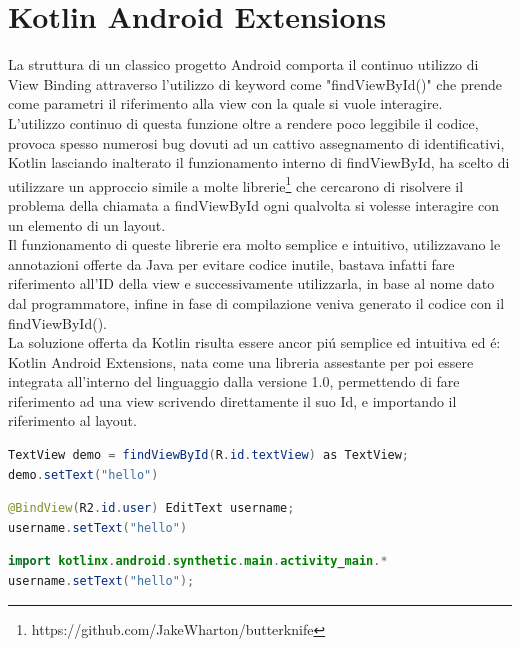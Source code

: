 \section{ Kotlin Android Extensions }
La struttura di un classico progetto Android comporta il continuo utilizzo di View Binding attraverso l'utilizzo di keyword come "findViewById()" che prende come parametri il riferimento alla view con la quale si vuole interagire. \\
L'utilizzo continuo di questa funzione oltre a rendere poco leggibile il codice, provoca spesso numerosi bug dovuti ad un cattivo assegnamento di identificativi, Kotlin lasciando inalterato il funzionamento interno di findViewById, ha scelto di utilizzare un approccio simile a molte librerie\footnote{https://github.com/JakeWharton/butterknife} che cercarono di risolvere il problema della chiamata a findViewById ogni qualvolta si volesse interagire con un elemento di un layout.\\
Il funzionamento di queste librerie era molto semplice e intuitivo, utilizzavano le annotazioni offerte da Java per evitare codice inutile, bastava infatti fare riferimento all'ID della view e successivamente utilizzarla, in base al nome dato dal programmatore, infine in fase di compilazione veniva generato il codice con il findViewById().\\
La soluzione offerta da Kotlin risulta essere ancor pi\'u semplice ed intuitiva ed \'e: Kotlin Android Extensions, nata come una libreria assestante per poi essere integrata all'interno del linguaggio dalla versione 1.0, permettendo di fare riferimento ad una view scrivendo direttamente il suo Id, e importando il riferimento al layout.

\begin{lstlisting}[language=java,caption={Esempio Java}]
TextView demo = findViewById(R.id.textView) as TextView;
demo.setText("hello")
\end{lstlisting}

\begin{lstlisting}[language=java,caption={Esempio Java + Libreria esterna}]
@BindView(R2.id.user) EditText username;
username.setText("hello")
\end{lstlisting}

\begin{lstlisting}[language=java,caption={Esempio KAE}]
import kotlinx.android.synthetic.main.activity_main.*
username.setText("hello");
\end{lstlisting}

\clearpage{\pagestyle{empty}\cleardoublepage}
